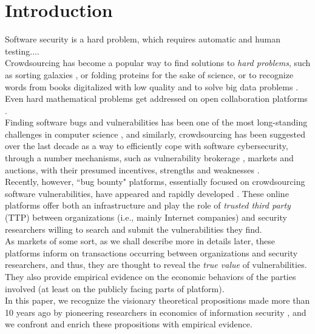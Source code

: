 \section{Introduction}
\label{sec:intro}
Software security is a hard problem, which requires automatic and human testing....\\

Crowdsourcing has become a popular way to find solutions to {\it hard problems}, such as sorting galaxies \cite{smith2013introduction}, or folding proteins \cite{khatib2011algorithm} for the sake of science, or to recognize words from books digitalized with low quality \cite{von2003captcha} and to solve big data problems \cite{narayanan2011link}. Even hard mathematical problems get addressed on open collaboration platforms \cite{gowers2009massively,cranshaw2011polymath}.\\

Finding software bugs and vulnerabilities has been one of the most long-standing challenges in computer science \cite{}, and similarly, crowdsourcing has been suggested over the last decade as a way to efficiently cope with software cybersecurity, through a number mechanisms, such as vulnerability brokerage \cite{camp2004pricing}, markets \cite{schechter2002buy} and auctions, with their presumed incentives, strengths and weaknesses \cite{ozment2004bug}.\\

Recently, however, ``bug bounty" platforms, essentially focused on crowdsourcing software vulnerabilities, have appeared and rapidly developed \cite{zhao2014exploratory,zhao2015empirical}. These online platforms offer both an infrastructure and play the role of {\it trusted third party} (TTP) between organizations (i.e., mainly Internet companies) and security researchers willing to search and submit the vulnerabilities they find.\\

As markets of some sort, as we shall describe more in details later, these platforms inform on transactions occurring between organizations and security researchers, and thus, they are thought to reveal the {\it true value} of vulnerabilities. They also provide empirical evidence on the economic behaviors of the parties involved (at least on the publicly facing parts of platform).\\

In this paper, we recognize the visionary theoretical propositions made more than 10 years ago by pioneering researchers in economics of information security \cite{schechter2002buy,ozment2004bug}, and we confront and enrich these propositions with empirical evidence.\\


